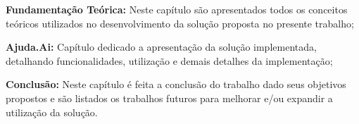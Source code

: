 \begin{lista}
  \item \textbf{Fundamentação Teórica:} Neste capítulo são apresentados todos os conceitos teóricos utilizados no desenvolvimento da solução proposta no presente trabalho;
  \item \textbf{Ajuda.Ai:} Capítulo dedicado a apresentação da solução implementada, detalhando funcionalidades, utilização e demais detalhes da implementação;
  \item \textbf{Conclusão:} Neste capítulo é feita a conclusão do trabalho dado seus objetivos propostos e são listados os trabalhos futuros para melhorar e/ou expandir a utilização da solução.
\end{lista}